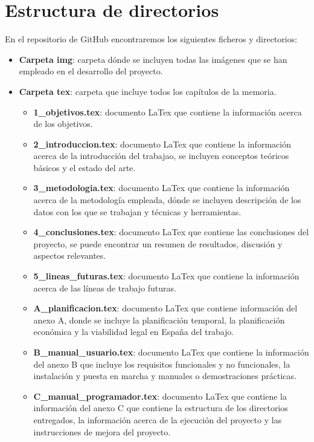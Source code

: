 
\section{Estructura de directorios}

En el repositorio de GitHub encontraremos los siguientes ficheros y directorios:
\begin{itemize}
    \item \textbf{Carpeta img}: carpeta dónde se incluyen todas las imágenes que se han empleado en el desarrollo del proyecto.
    \item \textbf{Carpeta tex}: carpeta que incluye todos los capítulos de la memoria.
    \begin{itemize}
        \item \textbf{1\_objetivos.tex}: documento LaTex que contiene la información acerca de los objetivos.
        \item \textbf{2\_introduccion.tex}: documento LaTex que contiene la información acerca de la introducción del trabajao, se incluyen conceptos teóricos básicos y el estado del arte.
        \item \textbf{3\_metodologia.tex}: documento LaTex que contiene la información acerca de la metodología empleada, dónde se incluyen descripción de los datos con los que se trabajan y técnicas y herramientas. 
        \item \textbf{4\_conclusiones.tex}: documento LaTex que contiene las conclusiones del proyecto, se puede encontrar un resumen de resultados, discusión y aspectos relevantes.
        \item \textbf{5\_lineas\_futuras.tex}: documento LaTex que contiene la información acerca de las líneas de trabajo futuras.
        \item \textbf{A\_planificacion.tex}: documento LaTex que contiene información del anexo A, donde se incluye la planificación temporal, la planificación económica y la viabilidad legal en España del trabajo.
        \item \textbf{B\_manual\_usuario.tex}: documento LaTex que contiene la información del anexo B que incluye los requisitos funcionales y no funcionales, la instalación y puesta en marcha y manuales o demostraciones prácticas.
        \item \textbf{C\_manual\_programador.tex}: documento LaTex que contiene la información del anexo C que contiene la estructura de los directorios entregados, la información acerca de la ejecución del proyecto y las instrucciones de mejora del proyecto.

\end{itemize}
\end{itemize}

